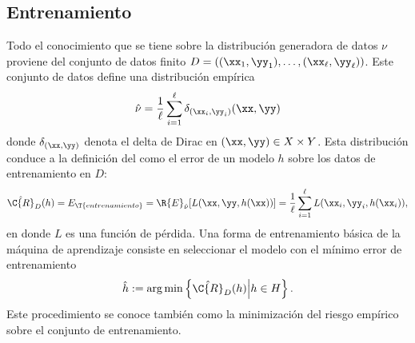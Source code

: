 %
%
\subsection{Entrenamiento}
%
Todo el conocimiento que se tiene sobre la distribución generadora de
datos $\nu$ proviene del conjunto de datos finito
$D=\left((\xx_1,\yy_1),\ldots,(\xx_\ell,\yy_\ell)\right)$. Este conjunto de
datos define una distribución empírica
%
\begin{align}
  \hat{\nu}=\frac{1}{\ell}\sum_{i=1}^{\ell}\delta_{(\xx_i,\yy_i)}(\xx,\yy)
\end{align}
%
donde $\delta_{(\xx,\yy)}$ denota el delta de Dirac en
$(\xx,\yy)\in{}X\times{}Y$. Esta distribución conduce a la definición del
 como el error de un modelo $h$ sobre los
datos de entrenamiento en $D$:
%
\begin{align}
  \hat{\C{R}}_D(h)=E_\T{entrenamiento}=\R{E}_{\hat{\nu}}[L(\xx,\yy,h(\xx))]
  =\frac{1}{\ell}\sum_{i=1}^\ell L(\xx_i, \yy_i, h(\xx_i)),
\end{align}
%
en donde $L$ es una función de pérdida.
Una forma de entrenamiento básica de la máquina de aprendizaje consiste en 
seleccionar el modelo con el mínimo error de entrenamiento
%
\begin{align}
  \hat{h}:=\arg \min \left\{ \hat{\C{R}}_D(h)\middle|h \in H\right\}.
\end{align}
%
Este procedimiento se conoce también como la minimización del riesgo
empírico sobre el conjunto de entrenamiento.
